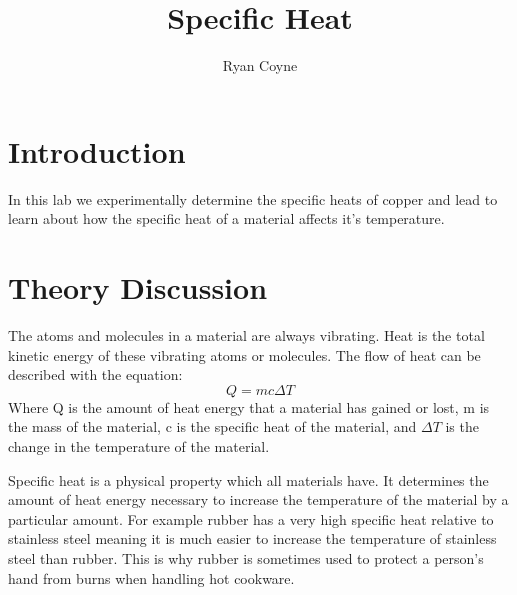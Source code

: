 \documentclass[12pt]{article}
\begin{document}
    \title{Specific Heat}
    \author{Ryan Coyne}
    \maketitle
    \section*{Introduction}
        In this lab we experimentally determine the specific heats of copper and lead to learn about how the specific heat of a material affects it's temperature. 
    \section*{Theory Discussion}
        The atoms and molecules in a material are always vibrating. Heat is the total kinetic energy of these vibrating atoms or molecules. The flow of heat can be described with the equation: 
        \begin{equation*}
            Q = mc\Delta T
        \end{equation*}
        Where Q is the amount of heat energy that a material has gained or lost, m is the mass of the material, c is the specific heat of the material, and \(\Delta T\) is the change in the temperature of the material.

        Specific heat is a physical property which all materials have. It determines the amount of heat energy necessary to increase the temperature of the material by a particular amount. For example rubber has a very high specific heat relative to stainless steel meaning it is much easier to increase the temperature of stainless steel than rubber. This is why rubber is sometimes used to protect a person's hand from burns when handling hot cookware.
\end{document}
